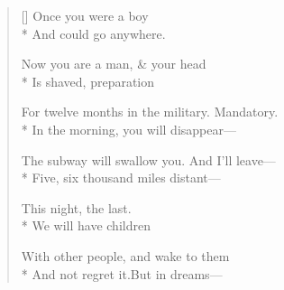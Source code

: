 \label{ch:milano_last_day}
\settowidth{\versewidth}{For twelve months in the military.   Mandatory.}
\begin{verse}[\versewidth]
Once you were a boy\\*
And could go anywhere.

Now you are a man, \& your head\\*
Is shaved, preparation

For twelve months in the military.   Mandatory.\\*
In the morning, you will disappear---

The subway will swallow you.   And I'll leave---\\*
Five, six thousand miles distant---

This night, the last.\\*
We will have children

With other people, and wake to them\\*
And not regret it.\qquad But in dreams---
\end{verse}
